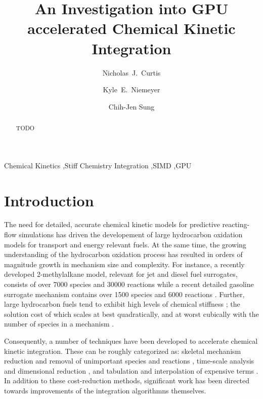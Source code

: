 \documentclass[preprint,12pt]{elsarticle}
\begin{document}
\begin{frontmatter}

\title{An Investigation into GPU accelerated Chemical Kinetic Integration}

\author[uconn]{Nicholas~J.\ Curtis}
\author[osu]{Kyle~E.\ Niemeyer}
\author[uconn]{Chih-Jen Sung}

\address[uconn]{Department of Mechanical Engineering\\
  University of Connecticut, Storrs, CT, 06269, USA}
\address[osu]{School of Mechanical, Industrial, and Manufacturing Engineering\\
  Oregon State University, Corvallis, OR 97331, USA}
  

\begin{abstract}
TODO
\end{abstract}

\begin{keyword}
 Chemical Kinetics \sep Stiff Chemistry Integration \sep SIMD \sep GPU
\end{keyword}

\end{frontmatter}

\section{Introduction}
\label{sec:Intro}

The need for detailed, accurate chemical kinetic models for predictive reacting-flow simulations has driven the developement of large hydrocarbon oxidation models for transport and energy relevant fuels.
At the same time, the growing understanding of the hydrocarbon oxidation process has resulted in orders of magnitude growth in mechanism size and complexity.  
For instance, a recently developed 2-methylalkane model, relevant for jet and diesel fuel surrogates, consists of over 7000 species and 30000 reactions \cite{Sarathy:2011kx} while a recent detailed gasoline surrogate mechanism contains over 1500 species and 6000 reactions \cite{Mehl:2011jn}.
Further, large hydrocarbon fuels tend to exhibit high levels of chemical stiffness \cite{Lu:2009gh}; the solution cost of which scales at best quadratically, and at worst cubically with the number of species in a mechanism \cite{Lu:2009gh}.

Consequently, a number of techniques have been developed to accelerate chemical kinetic integration.
These can be roughly categorized as: skeletal mechanism reduction and removal of unimportant species and reactions \cite{Lu:2005,Lu:2006bb,Lu:2008bi,Pepiot-Desjardins:2008,Niemeyer:2010bt,Niemeyer:2014,Curtis:2015aa,rabitz_sa,turanyi_sa_1,turanyi_sa_2,vajda_pca,valorani_csp2,valorani_csp}, time-scale analysis 
\cite{qssa,pe_approx1,pe_approx2} and dimensional reduction \cite{Lam:1993ub,Lam:1988wc,Lam:1994ws,Lu:2001ve,ildm}, and tabulation and interpolation of expensive terms \cite{Pope:1997wu,prism,Christo1996}.
In addition to these cost-reduction methods, significant work has been directed towards improvements of the integration algorithmns themselves.
\end{document}
